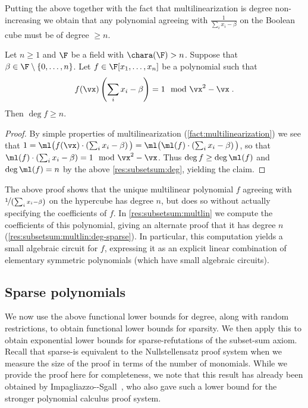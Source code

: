 \documentclass{toc}
\begin{document}
Putting the above together with the fact that multilinearization is degree non-increasing we obtain that any polynomial agreeing with $\frac{1}{\sum_i x_i-\beta}$ on the Boolean cube must be of degree $\ge n$.

\begin{corollary}\label{res:subsetsum:deg:ge}
        Let $n\ge 1$ and $\F$ be a field with $\chara(\F)>n$.  Suppose that $\beta\in \F\setminus\{0,\ldots,n\}$. Let $f\in\F[x_1,\ldots,x_n]$ be a polynomial such that
        \[
                f(\vx)\left(\sum_i x_i-\beta\right)=1 \mod \vx^2-\vx
                \;.
        \]
        Then $\deg f\ge n$.
\end{corollary}
\begin{proof}
        By simple properties of multilinearization (\autoref{fact:multilinearization}) we see that $1=\ml\big(f(\vx)\cdot\left(\sum_i x_i-\beta\right)\big)=\ml\big(\ml(f)\cdot\left(\sum_i x_i-\beta\right)\big)$, so that $\ml(f)\cdot \left(\sum_i x_i-\beta\right)=1\mod \vx^2-\vx$.  Thus $\deg f\ge \deg \ml(f)$ and $\deg \ml(f)=n$ by the above \autoref{res:subsetsum:deg}, yielding the claim.
\end{proof}

The above proof shows that the unique multilinear polynomial $f$ agreeing with $\nicefrac{1}{\left(\sum_i x_i-\beta\right)}$ on the hypercube has degree $n$, but does so without actually specifying the coefficients of $f$.  In \autoref{res:subsetsum:multlin} we compute the coefficients of this polynomial, giving an alternate proof that it has degree $n$ (\autoref{res:subsetsum:multlin:deg-sparse}).  In particular, this computation yields a small algebraic circuit for $f$, expressing it as an explicit linear combination of elementary symmetric polynomials (which have small algebraic circuits).

\subsection{Sparse polynomials}\label{sec:h-ips:lbs:sparse}

We now use the above functional lower bounds for degree, along with random restrictions, to obtain functional lower bounds for sparsity.  We then apply this to obtain exponential lower bounds for sparse-\lIPS refutations of the subset-sum axiom.  Recall that sparse-\lIPS is equivalent to the Nullstellensatz proof system when we measure the size of the proof in terms of the number of monomials.  While we provide the proof here for completeness, we note that this result has already been obtained by Impagliazzo-\Pudlak-Sgall~\cite{IPS99}, who also gave such a lower bound for the stronger polynomial calculus proof system.
\end{document}
